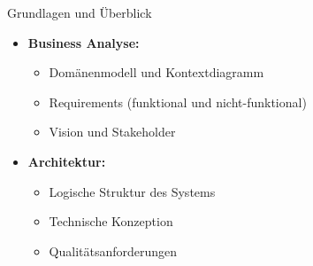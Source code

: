 \begin{concept}{Grundlagen und Überblick}
\begin{itemize}
    \item \textbf{Business Analyse:}
    \begin{itemize}
        \item Domänenmodell und Kontextdiagramm
        \item Requirements (funktional und nicht-funktional)
        \item Vision und Stakeholder
    \end{itemize}
    
    \item \textbf{Architektur:}
    \begin{itemize}
        \item Logische Struktur des Systems
        \item Technische Konzeption
        \item Qualitätsanforderungen
    \end{itemize}
    

\end{itemize}
\end{concept}
